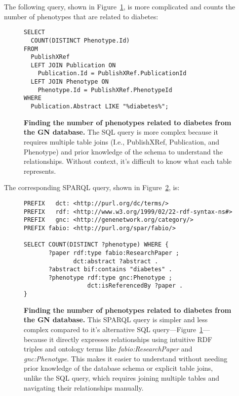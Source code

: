 The following query, shown in Figure~\ref{sql:counting-phenotypes-with-diabetes}, is more complicated and counts the number of phenotypes that are related to diabetes:

\begin{figure}[H]
\centering
\begin{verbatim}
SELECT
  COUNT(DISTINCT Phenotype.Id)
FROM
  PublishXRef
  LEFT JOIN Publication ON
    Publication.Id = PublishXRef.PublicationId 
  LEFT JOIN Phenotype ON
    Phenotype.Id = PublishXRef.PhenotypeId
WHERE
  Publication.Abstract LIKE "%diabetes%";
\end{verbatim}
\caption[SQL Query to count the number of phenotypes with the word ``diabetes'']{\textbf{Finding the number of phenotypes related to diabetes from the GN database.}  The SQL query is more complex because it requires multiple table joins (I.e., PublishXRef, Publication, and Phenotype) and prior knowledge of the schema to understand the relationships.  Without context, it's difficult to know what each table represents.}\label{sql:counting-phenotypes-with-diabetes}
\end{figure}

The corresponding SPARQL query, shown in Figure~\ref{sparql:counting-phenotypes-with-diabetes}, is:

\begin{figure}[H]
\centering
\begin{verbatim}
PREFIX   dct: <http://purl.org/dc/terms/>
PREFIX   rdf: <http://www.w3.org/1999/02/22-rdf-syntax-ns#>
PREFIX   gnc: <http://genenetwork.org/category/>
PREFIX fabio: <http://purl.org/spar/fabio/>

SELECT COUNT(DISTINCT ?phenotype) WHERE {
       ?paper rdf:type fabio:ResearchPaper ;
              dct:abstract ?abstract .
       ?abstract bif:contains "diabetes" .
       ?phenotype rdf:type gnc:Phenotype ;
                  dct:isReferencedBy ?paper .
}
\end{verbatim}
\caption[SPARQL Query to count the number of phenotypes with the word ``diabetes'']{\textbf{Finding the number of phenotypes related to diabetes from the GN database.}  This SPARQL query is simpler and less complex compared to it's alternative SQL query---Figure~\ref{sql:counting-phenotypes-with-diabetes}---because it directly expresses relationships using intuitive RDF triples and ontology terms like \textit{fabio:ResearchPaper} and \textit{gnc:Phenotype}.  This makes it easier to understand without needing prior knowledge of the database schema or explicit table joins, unlike the SQL query, which requires joining multiple tables and navigating their relationships manually.}\label{sparql:counting-phenotypes-with-diabetes}
\end{figure}

